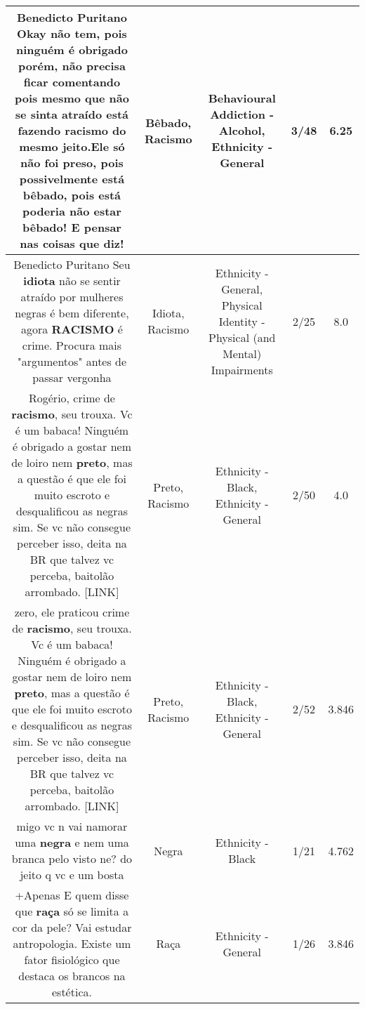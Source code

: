 \documentclass[11pt]{article}
\newlength\mylength
\begin{document}
\begin{center}
\begin{longtable}{|C{.65\mylength}|C{.30\mylength}|C{.12\mylength}|C{.12\mylength}|C{.12\mylength}|}
  \small Benedicto Puritano Okay não tem, pois ninguém é obrigado porém, não precisa ficar comentando pois mesmo que não se sinta atraído está fazendo \textbf{racismo} do mesmo jeito.Ele só não foi preso, pois possivelmente está \textbf{bêbado}, pois está poderia não estar \textbf{bêbado}! E pensar nas coisas que diz!\normalsize   & Bêbado, Racismo & Behavioural Addiction - Alcohol, Ethnicity - General & 3/48 & 6.25 \\  \hline
  \small Benedicto Puritano Seu \textbf{idiota} não se sentir atraído por mulheres negras é bem diferente, agora \textbf{RACISMO} é crime. Procura mais "argumentos" antes de passar vergonha\normalsize   & Idiota, Racismo & Ethnicity - General, Physical Identity - Physical (and Mental) Impairments & 2/25 & 8.0 \\  \hline
  \small Rogério, crime de \textbf{racismo}, seu trouxa. Vc é um babaca! Ninguém é obrigado a gostar nem de loiro nem \textbf{preto}, mas a questão é que ele foi muito escroto e desqualificou as negras sim. Se vc não consegue perceber isso, deita na BR que talvez vc perceba, baitolão arrombado. [LINK] \normalsize   & Preto, Racismo & Ethnicity - Black, Ethnicity - General & 2/50 & 4.0 \\  \hline
  \small zero, ele praticou crime de \textbf{racismo}, seu trouxa. Vc é um babaca! Ninguém é obrigado a gostar nem de loiro nem \textbf{preto}, mas a questão é que ele foi muito escroto e desqualificou as negras sim. Se vc não consegue perceber isso, deita na BR que talvez vc perceba, baitolão arrombado. [LINK] \normalsize   & Preto, Racismo & Ethnicity - Black, Ethnicity - General & 2/52 & 3.846 \\  \hline
  \small migo vc n vai namorar uma \textbf{negra} e nem uma branca pelo visto ne? do jeito q vc e um bosta\normalsize   & Negra & Ethnicity - Black & 1/21 & 4.762 \\  \hline
  \small +Apenas E quem disse que \textbf{raça} só se limita a cor da pele? Vai estudar antropologia. Existe um fator fisiológico que destaca os brancos na estética.\normalsize   & Raça & Ethnicity - General & 1/26 & 3.846 \\  \hline

\end{longtable}
\end{center}
\end{document}
